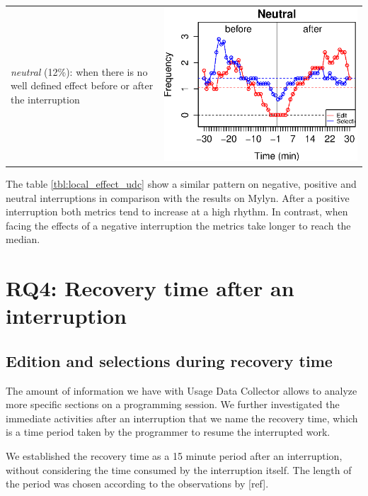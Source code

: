 \documentclass[conference]{IEEEtran}
\begin{document}
\begin{table}[ht!]
\begin{tabular}{p{4cm} | c}
\textit{neutral} (12\%): when there is no well defined effect before or after the interruption 
	& \includegraphics[valign=m,scale=0.3]{figures/udc_neu_ints} 
\end{tabular}
\end{table}

The table \ref{tbl:local_effect_udc} show a similar pattern on negative, positive and neutral interruptions in comparison with the results on Mylyn. After a positive interruption both metrics tend to increase at a high rhythm. In contrast, when facing the effects of a negative interruption the metrics take longer to reach the median.

\section{RQ4: Recovery time after an interruption}
\subsection{Edition and selections during recovery time}
The amount of information we have with Usage Data Collector allows to analyze more specific sections on a programming session. We further investigated the immediate activities after an interruption that we name the recovery time, which is a time period taken by the programmer to resume the interrupted work. 

We established the recovery time as a 15 minute period after an interruption, without considering the time consumed by the interruption itself. The length of the period was chosen according to the observations by [ref].
\end{document}
